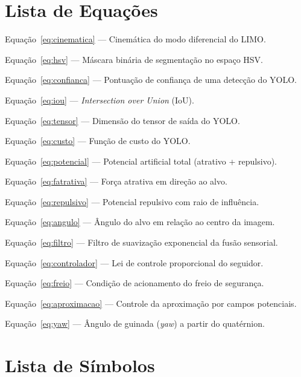 \documentclass[11pt, a4paper]{article}
\begin{document}
\listoftables
\newpage

\section*{Lista de Equações}

\newcommand{\eqitem}[2]{%
  \noindent Equação~\ref{#1} --- #2 \dotfill \pageref{#1}\par\vspace{3pt}}

\eqitem{eq:cinematica}{Cinemática do modo diferencial do LIMO.}
\eqitem{eq:hsv}{Máscara binária de segmentação no espaço HSV.}
\eqitem{eq:confianca}{Pontuação de confiança de uma detecção do YOLO.}
\eqitem{eq:iou}{\textit{Intersection over Union} (IoU).}
\eqitem{eq:tensor}{Dimensão do tensor de saída do YOLO.}
\eqitem{eq:custo}{Função de custo do YOLO.}
\eqitem{eq:potencial}{Potencial artificial total (atrativo + repulsivo).}
\eqitem{eq:fatrativa}{Força atrativa em direção ao alvo.}
\eqitem{eq:repulsivo}{Potencial repulsivo com raio de influência.}
\eqitem{eq:angulo}{Ângulo do alvo em relação ao centro da imagem.}
\eqitem{eq:filtro}{Filtro de suavização exponencial da fusão sensorial.}
\eqitem{eq:controlador}{Lei de controle proporcional do seguidor.}
\eqitem{eq:freio}{Condição de acionamento do freio de segurança.}
\eqitem{eq:aproximacao}{Controle da aproximação por campos potenciais.}
\eqitem{eq:yaw}{Ângulo de guinada (\textit{yaw}) a partir do quatérnion.}

\newpage

\section*{Lista de Símbolos}
\end{document}

